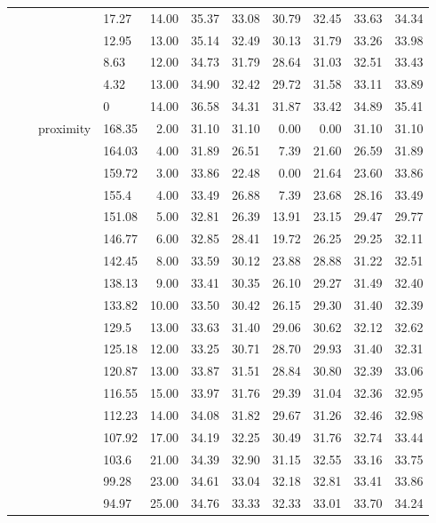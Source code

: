 \begin{longtable}{llllrrrrrrr}
   &  &  & 17.27 & 14.00 & 35.37 & 33.08 & 30.79 & 32.45 & 33.63 & 34.34 \\ 
   &  &  & 12.95 & 13.00 & 35.14 & 32.49 & 30.13 & 31.79 & 33.26 & 33.98 \\ 
   &  &  & 8.63 & 12.00 & 34.73 & 31.79 & 28.64 & 31.03 & 32.51 & 33.43 \\ 
   &  &  & 4.32 & 13.00 & 34.90 & 32.42 & 29.72 & 31.58 & 33.11 & 33.89 \\ 
   &  &  & 0 & 14.00 & 36.58 & 34.31 & 31.87 & 33.42 & 34.89 & 35.41 \\ 
   &  & proximity & 168.35 & 2.00 & 31.10 & 31.10 & 0.00 & 0.00 & 31.10 & 31.10 \\ 
   &  &  & 164.03 & 4.00 & 31.89 & 26.51 & 7.39 & 21.60 & 26.59 & 31.89 \\ 
   &  &  & 159.72 & 3.00 & 33.86 & 22.48 & 0.00 & 21.64 & 23.60 & 33.86 \\ 
   &  &  & 155.4 & 4.00 & 33.49 & 26.88 & 7.39 & 23.68 & 28.16 & 33.49 \\ 
   &  &  & 151.08 & 5.00 & 32.81 & 26.39 & 13.91 & 23.15 & 29.47 & 29.77 \\ 
   &  &  & 146.77 & 6.00 & 32.85 & 28.41 & 19.72 & 26.25 & 29.25 & 32.11 \\ 
   &  &  & 142.45 & 8.00 & 33.59 & 30.12 & 23.88 & 28.88 & 31.22 & 32.51 \\ 
   &  &  & 138.13 & 9.00 & 33.41 & 30.35 & 26.10 & 29.27 & 31.49 & 32.40 \\ 
   &  &  & 133.82 & 10.00 & 33.50 & 30.42 & 26.15 & 29.30 & 31.40 & 32.39 \\ 
   &  &  & 129.5 & 13.00 & 33.63 & 31.40 & 29.06 & 30.62 & 32.12 & 32.62 \\ 
   &  &  & 125.18 & 12.00 & 33.25 & 30.71 & 28.70 & 29.93 & 31.40 & 32.31 \\ 
   &  &  & 120.87 & 13.00 & 33.87 & 31.51 & 28.84 & 30.80 & 32.39 & 33.06 \\ 
   &  &  & 116.55 & 15.00 & 33.97 & 31.76 & 29.39 & 31.04 & 32.36 & 32.95 \\ 
   &  &  & 112.23 & 14.00 & 34.08 & 31.82 & 29.67 & 31.26 & 32.46 & 32.98 \\ 
   &  &  & 107.92 & 17.00 & 34.19 & 32.25 & 30.49 & 31.76 & 32.74 & 33.44 \\ 
   &  &  & 103.6 & 21.00 & 34.39 & 32.90 & 31.15 & 32.55 & 33.16 & 33.75 \\ 
   &  &  & 99.28 & 23.00 & 34.61 & 33.04 & 32.18 & 32.81 & 33.41 & 33.86 \\ 
   &  &  & 94.97 & 25.00 & 34.76 & 33.33 & 32.33 & 33.01 & 33.70 & 34.24 \\ 

\end{longtable}

